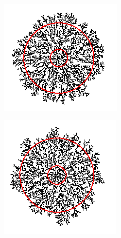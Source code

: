 \documentclass[12pt,a4paper]{scrartcl}
\newcommand{\1}{\mathbbm{1}}
\theoremstyle{definition}
\numberwithin{equation}{section}
\begin{document}
\begin{figure}[t]
	\begin{subfigure}[b]{.31\textwidth}
		\includegraphics[width=1\linewidth]{images/fractal_range/1.PNG}
	\end{subfigure}
	\begin{subfigure}[b]{.31\textwidth}
		\includegraphics[width=1\linewidth]{images/fractal_range/4.PNG}

\end{subfigure}
\end{figure}
\end{document}
